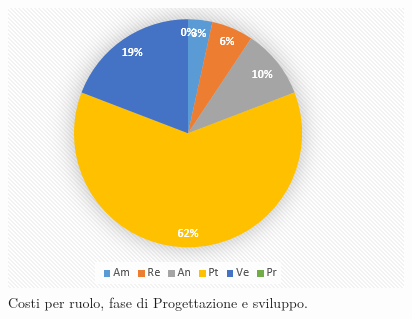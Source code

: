 \documentclass[a4paper]{article}
\begin{document}
			\begin{figure}[H]
				\centering
				\includegraphics[scale=0.7]{pc_costi_sviluppo}
				\caption{Costi per ruolo, fase di Progettazione e sviluppo.}
			\end{figure}
			
\end{document}

